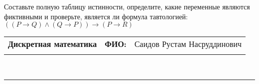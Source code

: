 \documentclass[10pt]{exam}
\newcommand{\class}{Дискретная математика}
\newcommand{\examdate}{}
\begin{document}
\begin{questions}
\begin{enumerate}[a)]
\end{enumerate}\question Составьте полную таблицу истинности, определите, какие переменные являются фиктивными и проверьте, является ли формула тавтологией:
$(( P \rightarrow Q) \land (Q \rightarrow P)) \rightarrow (P \rightarrow R)$

\end{questions}
\newpage
\begin{flushright}
\begin{tabular}{p{2.8in} r l}
\textbf{\class} & \textbf{ФИО:} &Саидов Рустам Насруддинович
\\

\textbf{\examdate} &&\\
\end{tabular}\\
\end{flushright}
\rule[1ex]{\textwidth}{.1pt}
\end{document}
